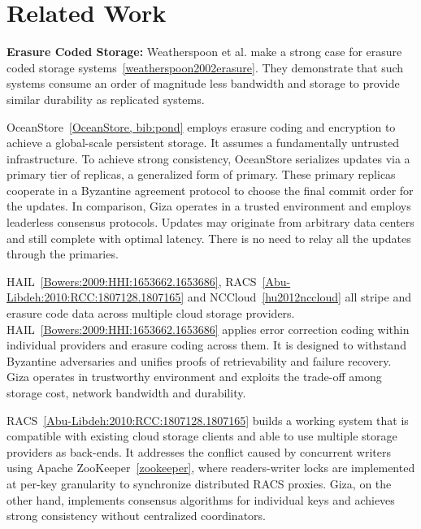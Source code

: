 \section{Related Work}


{\bf Erasure Coded Storage:}
Weatherspoon et al. make a strong case for erasure coded storage systems~\ref{weatherspoon2002erasure}. They demonstrate that such systems consume an order of magnitude less bandwidth and storage to provide similar durability as replicated systems.

OceanStore~\ref{OceanStore, bib:pond} employs erasure coding and encryption to achieve a global-scale persistent storage. It assumes a fundamentally untrusted infrastructure. To achieve strong consistency, OceanStore serializes updates via a primary tier of replicas, a generalized form of primary. These primary replicas cooperate in a Byzantine agreement protocol to choose the final commit order for the updates. In comparison, Giza operates in a trusted environment and employs leaderless consensus protocols. Updates may originate from arbitrary data centers and still complete with optimal latency. There is no need to relay all the updates through the primaries.

HAIL~\ref{Bowers:2009:HHI:1653662.1653686}, RACS~\ref{Abu-Libdeh:2010:RCC:1807128.1807165} and NCCloud~\ref{hu2012nccloud} all stripe and erasure code data across multiple cloud storage providers. 
HAIL~\ref{Bowers:2009:HHI:1653662.1653686} applies error correction coding within individual providers and erasure coding across them. It is designed to withstand Byzantine adversaries and unifies proofs of retrievability and failure recovery. Giza operates in trustworthy environment and exploits the trade-off among storage cost, network bandwidth and durability.

RACS~\ref{Abu-Libdeh:2010:RCC:1807128.1807165} 
builds a working system that is compatible with existing cloud storage clients and able to use multiple storage providers as back-ends.
It addresses the conflict caused by concurrent writers using Apache ZooKeeper~\ref{zookeeper}, where readers-writer locks are implemented at per-key granularity to synchronize distributed RACS proxies.
Giza, on the other hand, implements consensus algorithms for individual keys and achieves strong consistency without centralized coordinators.

